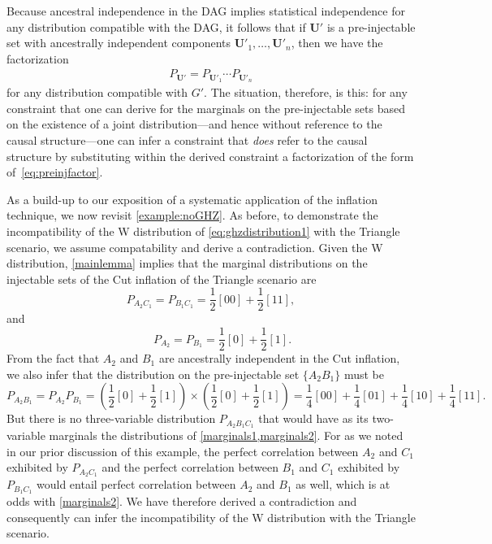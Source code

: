 \documentclass[aps,english,superscriptaddress,onecolumn,twoside,longbibliography,pra,floatfix,fleqn,nofootinbib]{revtex4-1}%
\theoremstyle{definition}
\newcounter{example}[section]
\begin{document}
Because ancestral independence in the DAG implies statistical independence for any distribution compatible with the DAG, it follows that  if 
$\bm{U}'$ is a pre-injectable set with ancestrally independent components $\bm{U}'_1,\ldots,\bm{U}'_n$, then we have the factorization
\begin{align}\label{eq:preinjfactor}
P_{\bm{U}'} = P_{\bm{U}'_1} \cdots P_{\bm{U}'_n}
\end{align}
for any distribution compatible with $G'$. The situation, therefore, is this: for any constraint that one can derive for the marginals on the pre-injectable sets based on the existence of a joint distribution---and hence without reference to the causal structure---one can infer a constraint that {\em does} refer to the causal structure by substituting within the derived constraint a factorization of the form of~\cref{eq:preinjfactor}. 

As a build-up to our exposition of a systematic application of the inflation technique, we now revisit \cref{example:noGHZ}.  As before, to demonstrate the incompatibility of the W distribution of \cref{eq:ghzdistribution1} with the Triangle scenario, we assume compatability and derive a contradiction.  Given the W distribution, \cref{mainlemma} implies that the marginal distributions on the injectable sets of the Cut inflation of the Triangle scenario are 
\begin{equation}
P_{A_2 C_1} = P_{B_1 C_1} = \frac{1}{2} [00] +\frac{1}{2} [11], 
\label{marginals1}
\end{equation}
and
\begin{equation}
\qquad P_{A_2} = P_{B_1}=\frac{1}{2} [0] +\frac{1}{2} [1].
\label{marginals1prime}
\end{equation}
From the fact that $A_2$ and $B_1$ are ancestrally independent in the Cut inflation, we also infer that the distribution on the pre-injectable set $\{A_2 B_1\}$ must be
\begin{equation}
P_{A_2 B_1} = P_{A_2}P_{B_1} = \left(\frac{1}{2} [0] +\frac{1}{2} [1]\right)\times\left(\frac{1}{2} [0] +\frac{1}{2} [1]\right)=\frac{1}{4} [00]+\frac{1}{4} [01]+\frac{1}{4} [10]+\frac{1}{4} [11].
\label{marginals2}
\end{equation}
But there is no three-variable distribution $P_{A_2 B_1 C_1}$ that would have as its two-variable marginals the distributions of \cref{marginals1,marginals2}. For as we noted in our prior discussion of this example, the perfect correlation between $A_2$ and $C_1$ exhibited by $P_{A_2 C_1}$ and the perfect correlation between $B_1$ and $C_1$ exhibited by $P_{B_1 C_1}$ would entail perfect correlation between $A_2$ and $B_1$ as well, which is at odds with \eqref{marginals2}. 
We have therefore derived a contradiction and consequently can infer the incompatibility of the W distribution with the Triangle scenario.
\end{document}
